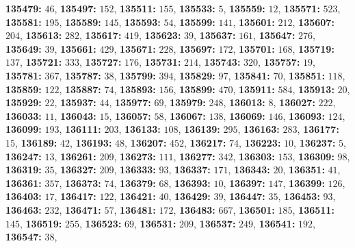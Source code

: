 \textsf{\bfseries 135479:} $46$, \textsf{\bfseries 135497:} $152$, \textsf{\bfseries 135511:} $155$, \textsf{\bfseries 135533:} $5$, \textsf{\bfseries 135559:} $12$, \textsf{\bfseries 135571:} $523$, \textsf{\bfseries 135581:} $195$, \textsf{\bfseries 135589:} $145$, \textsf{\bfseries 135593:} $54$, \textsf{\bfseries 135599:} $141$, \textsf{\bfseries 135601:} $212$, \textsf{\bfseries 135607:} $204$, \textsf{\bfseries 135613:} $282$, \textsf{\bfseries 135617:} $419$, \textsf{\bfseries 135623:} $39$, \textsf{\bfseries 135637:} $161$, \textsf{\bfseries 135647:} $276$, \textsf{\bfseries 135649:} $39$, \textsf{\bfseries 135661:} $429$, \textsf{\bfseries 135671:} $228$, \textsf{\bfseries 135697:} $172$, \textsf{\bfseries 135701:} $168$, \textsf{\bfseries 135719:} $137$, \textsf{\bfseries 135721:} $333$, \textsf{\bfseries 135727:} $176$, \textsf{\bfseries 135731:} $214$, \textsf{\bfseries 135743:} $320$, \textsf{\bfseries 135757:} $19$, \textsf{\bfseries 135781:} $367$, \textsf{\bfseries 135787:} $38$, \textsf{\bfseries 135799:} $394$, \textsf{\bfseries 135829:} $97$, \textsf{\bfseries 135841:} $70$, \textsf{\bfseries 135851:} $118$, \textsf{\bfseries 135859:} $122$, \textsf{\bfseries 135887:} $74$, \textsf{\bfseries 135893:} $156$, \textsf{\bfseries 135899:} $470$, \textsf{\bfseries 135911:} $584$, \textsf{\bfseries 135913:} $20$, \textsf{\bfseries 135929:} $22$, \textsf{\bfseries 135937:} $44$, \textsf{\bfseries 135977:} $69$, \textsf{\bfseries 135979:} $248$, \textsf{\bfseries 136013:} $8$, \textsf{\bfseries 136027:} $222$, \textsf{\bfseries 136033:} $11$, \textsf{\bfseries 136043:} $15$, \textsf{\bfseries 136057:} $58$, \textsf{\bfseries 136067:} $138$, \textsf{\bfseries 136069:} $146$, \textsf{\bfseries 136093:} $124$, \textsf{\bfseries 136099:} $193$, \textsf{\bfseries 136111:} $203$, \textsf{\bfseries 136133:} $108$, \textsf{\bfseries 136139:} $295$, \textsf{\bfseries 136163:} $283$, \textsf{\bfseries 136177:} $15$, \textsf{\bfseries 136189:} $42$, \textsf{\bfseries 136193:} $48$, \textsf{\bfseries 136207:} $452$, \textsf{\bfseries 136217:} $74$, \textsf{\bfseries 136223:} $10$, \textsf{\bfseries 136237:} $5$, \textsf{\bfseries 136247:} $13$, \textsf{\bfseries 136261:} $209$, \textsf{\bfseries 136273:} $111$, \textsf{\bfseries 136277:} $342$, \textsf{\bfseries 136303:} $153$, \textsf{\bfseries 136309:} $98$, \textsf{\bfseries 136319:} $35$, \textsf{\bfseries 136327:} $209$, \textsf{\bfseries 136333:} $93$, \textsf{\bfseries 136337:} $171$, \textsf{\bfseries 136343:} $20$, \textsf{\bfseries 136351:} $41$, \textsf{\bfseries 136361:} $357$, \textsf{\bfseries 136373:} $74$, \textsf{\bfseries 136379:} $68$, \textsf{\bfseries 136393:} $10$, \textsf{\bfseries 136397:} $147$, \textsf{\bfseries 136399:} $126$, \textsf{\bfseries 136403:} $17$, \textsf{\bfseries 136417:} $122$, \textsf{\bfseries 136421:} $40$, \textsf{\bfseries 136429:} $39$, \textsf{\bfseries 136447:} $35$, \textsf{\bfseries 136453:} $93$, \textsf{\bfseries 136463:} $232$, \textsf{\bfseries 136471:} $57$, \textsf{\bfseries 136481:} $172$, \textsf{\bfseries 136483:} $667$, \textsf{\bfseries 136501:} $185$, \textsf{\bfseries 136511:} $145$, \textsf{\bfseries 136519:} $255$, \textsf{\bfseries 136523:} $69$, \textsf{\bfseries 136531:} $209$, \textsf{\bfseries 136537:} $249$, \textsf{\bfseries 136541:} $192$, \textsf{\bfseries 136547:} $38$, 
